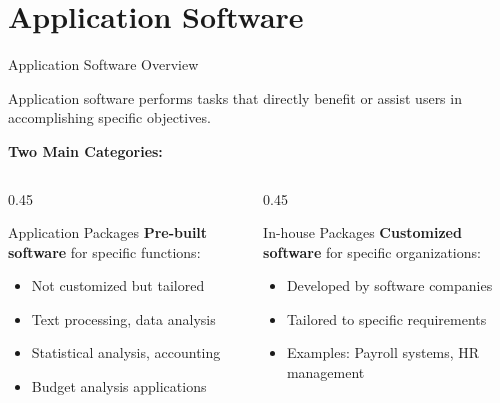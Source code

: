 \documentclass[aspectratio=169]{beamer}
\begin{document}
\section{Application Software}

\begin{frame}{Application Software Overview}
    \begin{definition}
        Application software performs tasks that directly benefit or assist users in accomplishing specific objectives.
    \end{definition}
    
    \textbf{Two Main Categories:}
    
    \begin{columns}
        \begin{column}{0.45\textwidth}
            \begin{block}{Application Packages}
                \textbf{Pre-built software} for specific functions:
                \begin{itemize}
                    \item Not customized but tailored
                    \item Text processing, data analysis
                    \item Statistical analysis, accounting
                    \item Budget analysis applications
                \end{itemize}
            \end{block}
        \end{column}
        \begin{column}{0.45\textwidth}
            \begin{block}{In-house Packages}
                \textbf{Customized software} for specific organizations:
                \begin{itemize}
                    \item Developed by software companies
                    \item Tailored to specific requirements
                    \item Examples: Payroll systems, HR management
                \end{itemize}
            \end{block}
        \end{column}
    \end{columns}
     
\end{frame}
\end{document}
